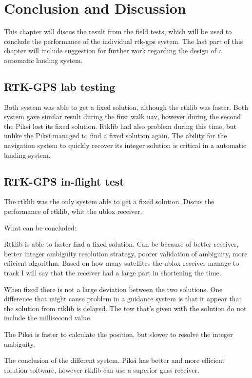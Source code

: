 
\chapter{Conclusion and Discussion}
This chapter will discus the result from the field tests, which will be used to conclude the performance of the individual \gls{rtk-gps} system. The last part of this chapter will include suggestion for further work regarding the design of a automatic landing system.
\section{RTK-GPS lab testing}
Both system was able to get a fixed solution, although the rtklib was faster. Both system gave similar result during the first walk \gls{uav}, however during the second the Piksi lost its fixed solution. Rtklib had also problem during this time, but unlike the Piksi managed to find a fixed solution again. The ability for the navigation system to quickly recover its integer solution is critical in a automatic landing system.
\section{RTK-GPS in-flight test}
The rtklib was the only system able to get a fixed solution. Discus the performance of rtklib, whit the ublox receiver. 

What can be concluded:

Rtklib is able to faster find a fixed solution. Can be because of better receiver, better integer ambiguity resolution strategy, poorer validation of ambiguity, more efficient algorithm. Based on how many satellites the ublox receiver manage to track I will say that the receiver had a large part in shortening the time.

When fixed there is not a large deviation between the two solutions. One difference that might cause problem in a guidance system is that it appear that the solution from rtklib is delayed. The \gls{tow} that's given with the solution do not include the millisecond value. 

The Piksi is faster to calculate the position, but slower to resolve the integer ambiguity. 

The conclusion of the different system. Piksi has better and more efficient solution software, however rtklib can use a superior \gls{gnss} receiver.

